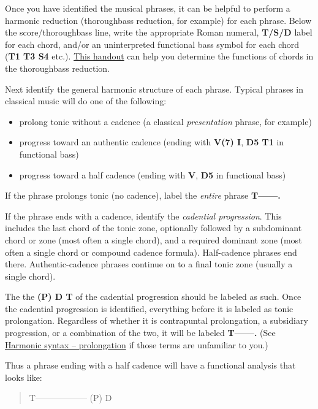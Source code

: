 \documentclass{book}
\providecommand{\tightlist}{%
  \setlength{\itemsep}{0pt}\setlength{\parskip}{0pt}}
\begin{document}
Once you have identified the musical phrases, it can be helpful to perform a
harmonic reduction (thoroughbass reduction, for example) for each phrase.
Below the score/thoroughbass line, write the appropriate Roman numeral,
\textbf{T/S/D} label for each chord, and/or an uninterpreted functional bass
symbol for each chord (\textbf{T1 T3 S4} etc.).
\href{images/Handouts/HarmoniesByBassScaleDegree.pdf}{This handout} can help
you determine the functions of chords in the thoroughbass reduction.

Next identify the general harmonic structure of each phrase. Typical phrases
in classical music will do one of the following:

\begin{itemize}
\tightlist
\item
  prolong tonic without a cadence (a classical \emph{presentation} phrase, for
  example)\\
\item
  progress toward an authentic cadence (ending with \textbf{V(7) I},
  \textbf{D5 T1} in functional bass)\\
\item
  progress toward a half cadence (ending with \textbf{V}, \textbf{D5} in
  functional bass)
\end{itemize}

If the phrase prolongs tonic (no cadence), label the \emph{entire} phrase
\textbf{T------.}

If the phrase ends with a cadence, identify the \emph{cadential progression}.
This includes the last chord of the tonic zone, optionally followed by a
subdominant chord or zone (most often a single chord), and a required dominant
zone (most often a single chord or compound cadence formula). Half-cadence
phrases end there. Authentic-cadence phrases continue on to a final tonic zone
(usually a single chord).

The the \textbf{(P) D T} of the cadential progression should be labeled as
such. Once the cadential progression is identified, everything before it is
labeled as tonic prolongation. Regardless of whether it is contrapuntal
prolongation, a subsidiary progression, or a combination of the two, it will
be labeled \textbf{T------.} (See
\href{http://openmusictheory.com/harmonicSyntax2.html}{Harmonic syntax --
prolongation} if those terms are unfamiliar to you.)

Thus a phrase ending with a half cadence will have a functional analysis that
looks like:

\begin{quote}
T------------------ (P) D
\end{quote}
\end{document}
